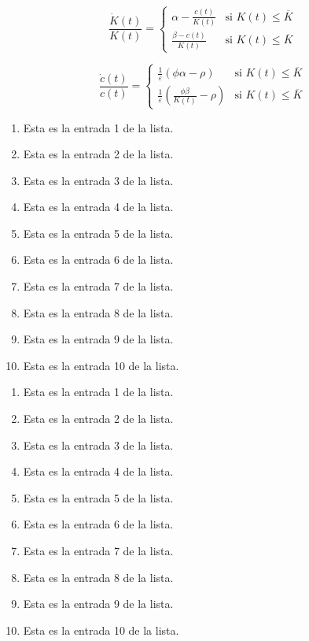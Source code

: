 \documentclass[12pt]{article}
\begin{document}
\begin{multicols*}{2}

$$\frac{\dot{K}(t)}{K(t)}=\begin{cases}\alpha -\frac{c(t)}{K(t)}& \text{si }K(t)\leq \overline{K}\\ \frac{\beta-c(t)}{K(t)} &\text{si } K(t)\leq \overline{K}\end{cases}$$

\columnbreak

$$\frac{\dot{c}(t)}{c(t)}=\begin{cases}\frac{1}{\varepsilon}(\phi\alpha -\rho)& \text{si }K(t)\leq \overline{K}\\ \frac{1}{\varepsilon}\left(\frac{\phi\beta}{K(t)}-\rho\right) &\text{si } K(t)\leq \overline{K}\end{cases}$$
\vspace*{0.5cm}
\end{multicols*}

\newpage

\begin{enumerate}[start=1,
label={\bfseries Elemento \Alph*.},
leftmargin=1cm]
\item Esta es la entrada 1 de la lista.
\item Esta es la entrada 2 de la lista.
\item Esta es la entrada 3 de la lista.
\item Esta es la entrada 4 de la lista.
\item Esta es la entrada 5 de la lista.
\item Esta es la entrada 6 de la lista.
\item Esta es la entrada 7 de la lista.
\item Esta es la entrada 8 de la lista.
\item Esta es la entrada 9 de la lista.
\item Esta es la entrada 10 de la lista.
\end{enumerate}

\vfill

\hfill
\begin{enumerate}[start=1,
label={\bfseries \itshape  \Roman*.},
leftmargin=1cm, rightmargin=1cm]
  \item  \dotfill  Esta es la entrada 1 de la lista.
  \item  \dotfill  Esta es la entrada 2 de la lista.
  \item  \dotfill  Esta es la entrada 3 de la lista.
  \item  \dotfill  Esta es la entrada 4 de la lista.
  \item  \dotfill  Esta es la entrada 5 de la lista.
  \item  \dotfill  Esta es la entrada 6 de la lista.
  \item  \dotfill  Esta es la entrada 7 de la lista.
  \item  \dotfill  Esta es la entrada 8 de la lista.
  \item  \dotfill  Esta es la entrada 9 de la lista.
  \item  \dotfill  Esta es la entrada 10 de la lista.
\end{enumerate}
\end{document}
